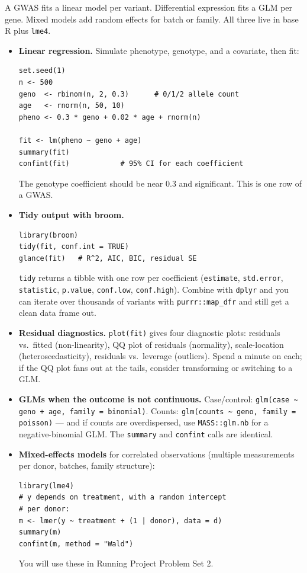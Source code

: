 A GWAS fits a linear model per variant. Differential expression fits a GLM per gene. Mixed models add random effects for batch or family. All three live in base R plus \texttt{lme4}.
\begin{itemize}[nosep]
  \item \textbf{Linear regression.} Simulate phenotype, genotype, and a covariate, then fit:
    \begin{lstlisting}
set.seed(1)
n <- 500
geno  <- rbinom(n, 2, 0.3)      # 0/1/2 allele count
age   <- rnorm(n, 50, 10)
pheno <- 0.3 * geno + 0.02 * age + rnorm(n)

fit <- lm(pheno ~ geno + age)
summary(fit)
confint(fit)            # 95% CI for each coefficient
    \end{lstlisting}
    The genotype coefficient should be near 0.3 and significant. This is one row of a GWAS.
  \item \textbf{Tidy output with broom.}
    \begin{lstlisting}
library(broom)
tidy(fit, conf.int = TRUE)
glance(fit)   # R^2, AIC, BIC, residual SE
    \end{lstlisting}
    \texttt{tidy} returns a tibble with one row per coefficient (\texttt{estimate}, \texttt{std.error}, \texttt{statistic}, \texttt{p.value}, \texttt{conf.low}, \texttt{conf.high}). Combine with \texttt{dplyr} and you can iterate over thousands of variants with \texttt{purrr::map\_dfr} and still get a clean data frame out.
  \item \textbf{Residual diagnostics.} \texttt{plot(fit)} gives four diagnostic plots: residuals vs.\ fitted (non-linearity), QQ plot of residuals (normality), scale-location (heteroscedasticity), residuals vs.\ leverage (outliers). Spend a minute on each; if the QQ plot fans out at the tails, consider transforming or switching to a GLM.
  \item \textbf{GLMs when the outcome is not continuous.} Case/control: \texttt{glm(case \textasciitilde{} geno + age, family = binomial)}. Counts: \texttt{glm(counts \textasciitilde{} geno, family = poisson)} --- and if counts are overdispersed, use \texttt{MASS::glm.nb} for a negative-binomial GLM. The \texttt{summary} and \texttt{confint} calls are identical.
  \item \textbf{Mixed-effects models} for correlated observations (multiple measurements per donor, batches, family structure):
    \begin{lstlisting}
library(lme4)
# y depends on treatment, with a random intercept
# per donor:
m <- lmer(y ~ treatment + (1 | donor), data = d)
summary(m)
confint(m, method = "Wald")
    \end{lstlisting}
    You will use these in Running Project Problem Set 2.
\end{itemize}
